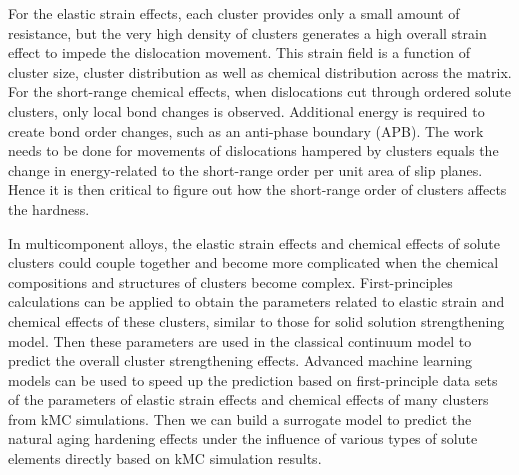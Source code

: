 For the elastic strain effects, each cluster provides only a small amount of resistance, but the very high density of clusters generates a high overall strain effect to impede the dislocation movement. This strain field is a function of cluster size, cluster distribution as well as chemical distribution across the matrix. For the short-range chemical effects, when dislocations cut through ordered solute clusters, only local bond changes is observed. Additional energy is required to create bond order changes, such as an anti-phase boundary (APB). The work needs to be done for movements of dislocations hampered by clusters equals the change in energy-related to the short-range order per unit area of slip planes. Hence it is then critical to figure out how the short-range order of clusters affects the hardness. %


In multicomponent alloys, the elastic strain effects and chemical effects of solute clusters could couple together and become more complicated when the chemical compositions and structures of clusters become complex. First-principles calculations can be applied to obtain the parameters related to elastic strain and chemical effects of these clusters, similar to those for solid solution strengthening model\cite{yasi2010first}.  Then these parameters are used in the classical continuum model to predict the overall cluster strengthening effects. Advanced machine learning models can be used to speed up the prediction based on first-principle data sets of the parameters of elastic strain effects and chemical effects of many clusters from \ac{kMC} simulations. Then we can build a surrogate model to predict the natural aging hardening effects under the influence of various types of solute elements directly based on \ac{kMC} simulation results.